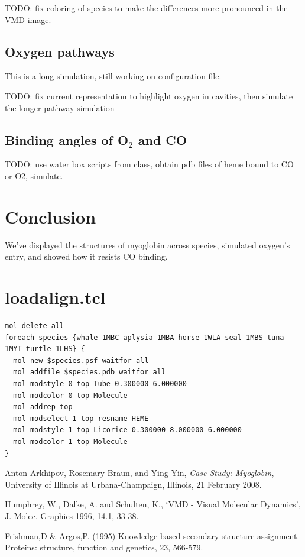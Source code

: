 \documentclass{article}
\begin{document}
\begin{figure}
\end{figure}

TODO: fix coloring of species to make the differences more pronounced in the VMD image.

\subsection{Oxygen pathways}
This is a long simulation, still working on configuration file.

TODO: fix current representation to highlight oxygen in cavities, then simulate the longer pathway simulation

\subsection{Binding angles of O$_2$ and CO}
TODO: use water box scripts from class, obtain pdb files of heme bound to CO or O2, simulate.


\section{Conclusion}

We've displayed the structures of myoglobin across species, simulated oxygen's entry, and showed how it resists CO binding.

\appendix

\section{loadalign.tcl}
\label{lst:loadalign}

\begin{lstlisting}
mol delete all
foreach species {whale-1MBC aplysia-1MBA horse-1WLA seal-1MBS tuna-1MYT turtle-1LHS} {
  mol new $species.psf waitfor all
  mol addfile $species.pdb waitfor all
  mol modstyle 0 top Tube 0.300000 6.000000
  mol modcolor 0 top Molecule
  mol addrep top
  mol modselect 1 top resname HEME
  mol modstyle 1 top Licorice 0.300000 8.000000 6.000000
  mol modcolor 1 top Molecule
}
\end{lstlisting}

\begin{thebibliography}{9}
	Anton Arkhipov, Rosemary Braun, and Ying Yin,
	\textit{Case Study: Myoglobin},
	University of Illinois at Urbana-Champaign, Illinois,
	21 February 2008.
	
	Humphrey, W., Dalke, A. and Schulten, K., `VMD - Visual
	Molecular Dynamics', J. Molec. Graphics 1996, 14.1, 33-38.

	Frishman,D \& Argos,P. (1995) Knowledge-based secondary structure
	assignment. Proteins: structure, function and genetics, 23, 566-579.

\end{thebibliography}

\vspace{\fill}

\end{document}
